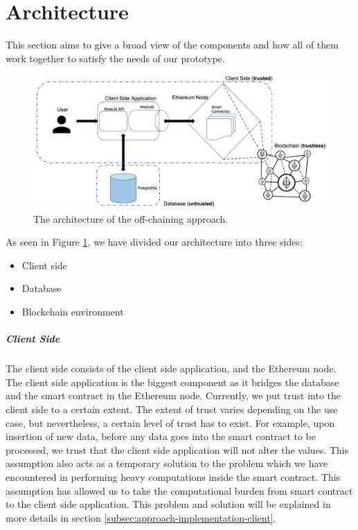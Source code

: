 \section{Architecture}

This section aims to give a broad view of the components and how all of them work together to satisfy the needs of our prototype. 

\begin{figure}[t]%
	\centering
	\includegraphics[width=1.0\textwidth]{images/architecture.png}
	\caption{\label{fig:architecture}The architecture of the off-chaining approach.}
\end{figure}

As seen in Figure \ref{fig:architecture}, we have divided our architecture into three sides:
\begin{itemize}
	\item Client side
	\item Database
	\item Blockchain environment
\end{itemize}

\subparagraph{Client Side}
The client side consists of the client side application, and the Ethereum node. The client side application is the biggest component as it bridges the database and the smart contract in the Ethereum node. Currently, we put trust into the client side to a certain extent. The extent of trust varies depending on the use case, but nevertheless, a certain level of trust has to exist. For example, upon insertion of new data, before any data goes into the smart contract to be processed, we trust that the client side application will not alter the values. This assumption also acts as a temporary solution to the problem which we have encountered in performing heavy computations inside the smart contract. This assumption has allowed us to take the computational burden from smart contract to the client side application. This problem and solution will be explained in more details in section \ref{subsec:approach-implementation-client}.

